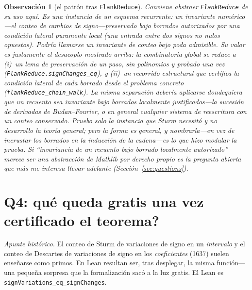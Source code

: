 \documentclass[11pt]{article}
\newtheorem{remark}{Observaci\'on}
\newcommand{\lean}[1]{\texttt{#1}}
\begin{document}
\begin{remark}[el patr\'on tras \lean{FlankReduce}]\label{rem:pattern}
Conviene abstraer \lean{FlankReduce} de su uso aqu\'i. Es una instancia de un esquema recurrente: un
invariante num\'erico---el conteo de cambios de signo---preservado bajo borrados autorizados por una
condici\'on lateral puramente \emph{local} (una entrada entre dos signos no nulos opuestos). Podr\'ia
llamarse un \emph{invariante de conteo bajo poda admisible}. Su valor es justamente el desacoplo
mostrado arriba: la combinatoria global se reduce a (i)~un lema de preservaci\'on de un paso, sin
polinomios y probado una vez (\lean{FlankReduce.signChanges\_eq}), y (ii)~un recorrido estructural que
certifica la condici\'on lateral de cada borrado desde el problema concreto
(\lean{flankReduce\_chain\_walk}). La misma separaci\'on deber\'ia aplicarse dondequiera que un
recuento sea invariante bajo borrados localmente justificados---la sucesi\'on de derivadas de
Budan--Fourier, o en general cualquier sistema de reescritura con un conteo conservado. Pruebo solo la
instancia que Sturm necesit\'o y no desarrollo la teor\'ia general; pero la forma es general, y
nombrarla---en vez de incrustar los borrados en la inducci\'on de la cadena---es lo que hizo modular la
prueba. Si ``invariancia de un recuento bajo borrado localmente autorizado'' merece ser una
abstracci\'on de Mathlib por derecho propio es la pregunta abierta que m\'as me interesa llevar
adelante (Secci\'on~\ref{sec:questions}).
\end{remark}

\section{Q4: \textquestiondown qu\'e queda gratis una vez certificado el teorema?}\label{sec:q4}

\emph{Apunte hist\'orico.} El conteo de Sturm de variaciones de signo en un \emph{intervalo} y el
conteo de Descartes de variaciones de signo en los \emph{coeficientes} (1637) suelen ense\~narse como
primos. En Lean resultan ser, tras desplegar, la misma funci\'on---una peque\~na sorpresa que la
formalizaci\'on sac\'o a la luz gratis. El Lean es \lean{signVariations\_eq\_signChanges}.
\end{document}

